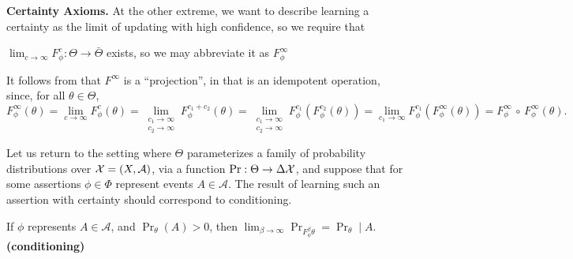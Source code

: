 \documentclass{article}
\begin{document}
\textbf{Certainty Axioms.}
At the other extreme, we want to describe learning a certainty as the limit of updating with high confidence, so we require that
\begin{URaxioms}
    \item
        $\displaystyle\lim_{c \to \infty} F^{c}_\phi : \Theta \to \bar\Theta$
        exists, so we may abbreviate it as $F^\infty_\phi$
        \label{ax:cert-exists}
\end{URaxioms}

It follows from  that
$F^\infty$
is a ``projection'', in that is an idempotent operation, since,
for all $\theta \in \Theta$,
\[
    F^\infty_\phi (\theta)
        = \lim_{c \to \infty} F^{c}_\phi (\theta)
        = \lim_{\substack{c_1 \to \infty \\ c_2 \to \infty}}
            F^{c_1 + c_2}_\phi (\theta)
        = \lim_{\substack{c_1 \to \infty \\ c_2 \to \infty}}
            F^{c_1}_\phi ( F^{c_2}_\phi (\theta))
        = \lim_{c_1 \to \infty} F^{c_1}_\phi (F^{\infty}_\phi(\theta))
        = F^\infty_\phi \,\circ\, F^\infty_\phi  (\theta)
        .
\]

Let us return to the setting where $\Theta$ parameterizes a family of probability distributions over $\mathcal X = (X, \mathcal A)$, via a function $\Pr : \Theta \to \Delta\mathcal X$,
and suppose that for some assertions $\phi \in \Phi$ represent events $A \in \mathcal A$.
The result of learning such an assertion with certainty should correspond to conditioning.

\begin{URaxioms}
    \item If $\phi$ represents $A \in \mathcal A$, and $\Pr_{\theta}(A) > 0$, then
        $\displaystyle \lim_{\beta\to\infty} \Pr_{ F^\beta_\phi\theta } = \Pr_\theta \mid A$.
        \hfill \textbf{(conditioning)} \label{ax:conditioning}

\end{URaxioms}
\end{document}
